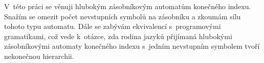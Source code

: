 
V~této práci se věnuji hlubokým zásobníkovým automatům konečného indexu. Snažím se omezit počet nevstupních symbolů na zásobníku a zkoumám sílu tohoto typu automatu.
Dále se zabývám ekvivalencí s~programovými gramatikami, což vede k~otázce, zda rodina jazyků přijímaná hlubokými zásobníkovými automaty konečného indexu s~jedním nevstupním 
symbolem tvoří nekonečnou hierarchii. 








